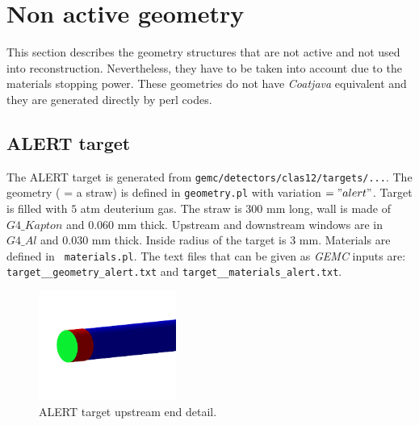 {\newpage	
\section{Non active geometry}
This section describes the geometry structures that are not active and not used into reconstruction. Nevertheless, they have to be taken into account due to the materials stopping power. These geometries do not have \textit{Coatjava} equivalent and they are generated directly by perl codes.
	
	\subsection{ALERT target}
	The ALERT target is generated from \texttt{gemc/detectors/clas12/targets/...}. The geometry ( = a straw) is defined in \texttt{geometry.pl} with variation $ = "alert"$. Target is filled with $5$ atm deuterium gas. The straw is 300 mm long, wall is made of $G4\_Kapton$ and $0.060$ mm thick. Upstream and downstream windows are in $G4\_Al$ and $0.030$ mm thick. Inside radius of the target is $3$ mm. Materials are defined in \texttt{ materials.pl}. The text files that can be given as \textit{GEMC} inputs are: \texttt{target\_\_geometry\_alert.txt} and \texttt{target\_\_materials\_alert.txt}.
	\begin{figure}[H]
	\centering
	\includegraphics[width=0.4\textwidth]{gemc_ALERT_TG_upstreamEnd2.png}
	\caption{ALERT target upstream end detail.}
	\label{fig:tg_gemc}
	\end{figure}	
	
}
